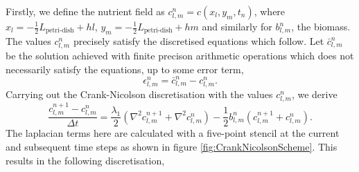 Firstly, we 
define the nutrient field as $c_{l,m}^{n} = c(x_l, y_m, t_n)$, where $x_l = -\frac{1}{2}L_{\textrm{petri-dish}} + h l$, 
$y_m = -\frac{1}{2}L_{\textrm{petri-dish}} + h m$ and similarly for $b_{l,m}^{n}$,
the biomass. The values  $c_{l,m}^{n}$ precisely satisfy the discretised equations which follow.
Let  $\bar{c}_{l,m}^{n}$ be the solution achieved with finite precison arithmetic 
operations which does not necessarily satisfy the equations, up to some error term,
\begin{equation*}
    \epsilon_{l,m}^n = \bar{c}_{l,m}^{n} - c_{l,m}^{n}.
\end{equation*}
Carrying out the Crank-Nicolson discretisation with the values $c_{l,m}^{n}$, we derive
\begin{equation*}
    \frac{c_{l,m}^{n+1} - c_{l,m}^{n}}{\Delta t} =
    \frac{\lambda_1}{2} \left( \nabla^2 c_{l,m}^{n+1} + \nabla^2 c_{l,m}^{n} \right) -
     \frac{1}{2} b_{l,m}^{n} (c_{l,m}^{n+1} + c_{l,m}^{n}).
\end{equation*}
The laplacian terms here are calculated with a five-point stencil at the current and subsequent 
time steps as shown in figure \ref{fig:CrankNicolsonScheme}. This results in the following discretisation,

